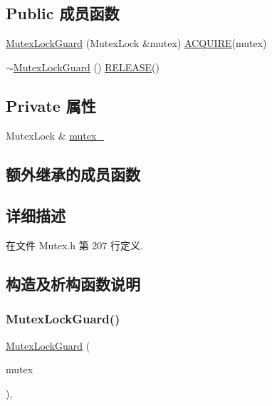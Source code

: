 \subsection*{Public 成员函数}
\begin{DoxyCompactItemize}
\item 
\hyperlink{classmuduo_1_1MutexLockGuard_aecb55eb17972d1ad7256334d7efb2ec7}{Mutex\+Lock\+Guard} (Mutex\+Lock \&mutex) \hyperlink{Mutex_8h_aa826316eb51d0a47bf60521c39469bed}{A\+C\+Q\+U\+I\+RE}(mutex)
\item 
\hyperlink{classmuduo_1_1MutexLockGuard_a1ab0f8beccc64b8be8516108f1152ef5}{$\sim$\+Mutex\+Lock\+Guard} () \hyperlink{Mutex_8h_a59a3415d4063936405dfca342973c2ea}{R\+E\+L\+E\+A\+SE}()
\end{DoxyCompactItemize}
\subsection*{Private 属性}
\begin{DoxyCompactItemize}
\item 
Mutex\+Lock \& \hyperlink{classmuduo_1_1MutexLockGuard_a06a4780af4c6dd060869c14027ee8055}{mutex\+\_\+}
\end{DoxyCompactItemize}
\subsection*{额外继承的成员函数}


\subsection{详细描述}


在文件 Mutex.\+h 第 207 行定义.



\subsection{构造及析构函数说明}
\mbox{\label{classmuduo_1_1MutexLockGuard_aecb55eb17972d1ad7256334d7efb2ec7}} 
\subsubsection{\texorpdfstring{Mutex\+Lock\+Guard()}{MutexLockGuard()}}
{\footnotesize\ttfamily \hyperlink{classmuduo_1_1MutexLockGuard}{Mutex\+Lock\+Guard} (\begin{DoxyParamCaption}\item[{Mutex\+Lock \&}]{mutex }\end{DoxyParamCaption})\hspace{0.3cm}{\ttfamily [inline]}, {\ttfamily [explicit]}}



